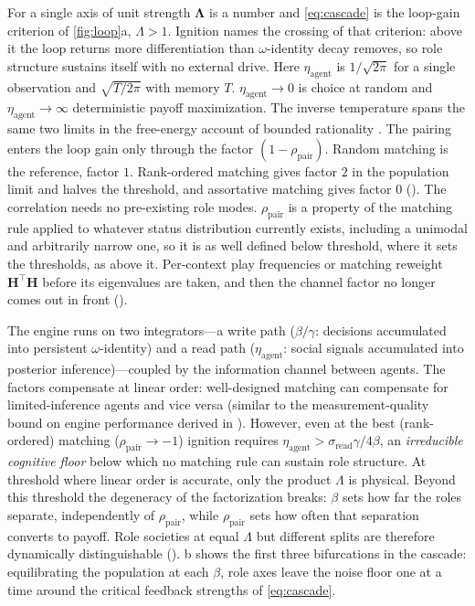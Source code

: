 \documentclass[
  aps,prx,
  reprint,
  superscriptaddress,
  nofootinbib,
  longbibliography
]{revtex4-2}
\newcommand{\Lam}{\bm{\Lambda}}
\newcommand{\etaag}{\eta_{\mathrm{agent}}}
\newcommand{\rhopair}{\rho_{\mathrm{pair}}}
\newcommand{\sread}{\sigma_{\mathrm{read}}}
\newcommand{\smref}[1]{\cite[Sec.~#1]{SM}}
\begin{document}
For a single axis of unit strength $\Lam$ is a number and \cref{eq:cascade} is the loop-gain criterion of \cref{fig:loop}a, $\Lambda>1$. Ignition names the crossing of that criterion: above it the loop returns more differentiation than $\omega$-identity decay removes, so role structure sustains itself with no external drive. Here $\etaag$ is $1/\sqrt{2\pi}$ for a single observation and $\sqrt{T/2\pi}$ with memory $T$. $\etaag\to0$ is choice at random and $\etaag\to\infty$ deterministic payoff maximization. The inverse temperature spans the same two limits in the free-energy account of bounded rationality \cite{ortega2013}. The pairing enters the loop gain only through the factor $(1-\rhopair)$. Random matching is the reference, factor $1$. Rank-ordered matching gives factor $2$ in the population limit and halves the threshold, and assortative matching gives factor $0$ (\smref{S2}). The correlation needs no pre-existing role modes. $\rhopair$ is a property of the matching rule applied to whatever status distribution currently exists, including a unimodal and arbitrarily narrow one, so it is as well defined below threshold, where it sets the thresholds, as above it. Per-context play frequencies or matching reweight $\bm{H}^{\!\top}\bm{H}$ before its eigenvalues are taken, and then the channel factor no longer comes out in front (\smref{S2\,C}).

The engine runs on two integrators---a write path ($\beta/\gamma$: decisions accumulated into persistent $\omega$-identity) and a read path ($\etaag$: social signals accumulated into posterior inference)---coupled by the information channel between agents. The factors compensate at linear order: well-designed matching can compensate for limited-inference agents and vice versa (similar to the measurement-quality bound on engine performance derived in \cite{Castro2026}). However, even at the best (rank-ordered) matching ($\rhopair\to-1$) ignition requires $\etaag > \sread\gamma/4\beta$, an \emph{irreducible cognitive floor} below which no matching rule can sustain role structure. At threshold where linear order is accurate, only the product $\Lambda$ is physical. Beyond this threshold the degeneracy of the factorization breaks: $\beta$ sets how far the roles separate, independently of $\rhopair$, while $\rhopair$ sets how often that separation converts to payoff. Role societies at equal $\Lambda$ but different splits are therefore dynamically distinguishable (\smref{S2}). b shows the first three bifurcations in the cascade: equilibrating the population at each $\beta$, role axes leave the noise floor one at a time around the critical feedback strengths of \cref{eq:cascade}.
\end{document}
